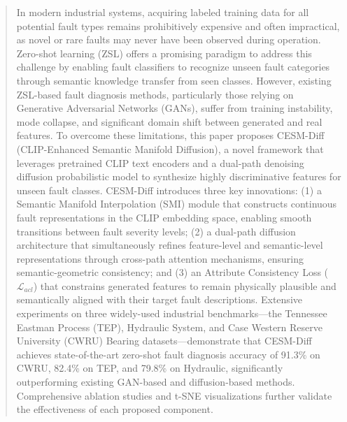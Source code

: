 \begin{abstract}
In modern industrial systems, acquiring labeled training data for all potential fault types remains prohibitively expensive and often impractical, as novel or rare faults may never have been observed during operation. Zero-shot learning (ZSL) offers a promising paradigm to address this challenge by enabling fault classifiers to recognize unseen fault categories through semantic knowledge transfer from seen classes. However, existing ZSL-based fault diagnosis methods, particularly those relying on Generative Adversarial Networks (GANs), suffer from training instability, mode collapse, and significant domain shift between generated and real features. To overcome these limitations, this paper proposes CESM-Diff (CLIP-Enhanced Semantic Manifold Diffusion), a novel framework that leverages pretrained CLIP text encoders and a dual-path denoising diffusion probabilistic model to synthesize highly discriminative features for unseen fault classes. CESM-Diff introduces three key innovations: (1) a Semantic Manifold Interpolation (SMI) module that constructs continuous fault representations in the CLIP embedding space, enabling smooth transitions between fault severity levels; (2) a dual-path diffusion architecture that simultaneously refines feature-level and semantic-level representations through cross-path attention mechanisms, ensuring semantic-geometric consistency; and (3) an Attribute Consistency Loss ($\mathcal{L}_{acl}$) that constrains generated features to remain physically plausible and semantically aligned with their target fault descriptions. Extensive experiments on three widely-used industrial benchmarks---the Tennessee Eastman Process (TEP), Hydraulic System, and Case Western Reserve University (CWRU) Bearing datasets---demonstrate that CESM-Diff achieves state-of-the-art zero-shot fault diagnosis accuracy of 91.3\% on CWRU, 82.4\% on TEP, and 79.8\% on Hydraulic, significantly outperforming existing GAN-based and diffusion-based methods. Comprehensive ablation studies and t-SNE visualizations further validate the effectiveness of each proposed component.
\end{abstract}
